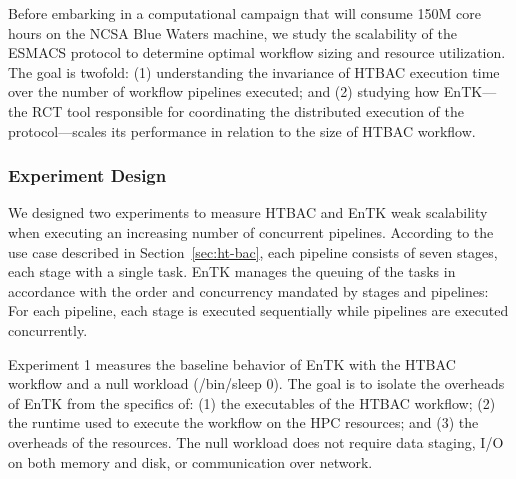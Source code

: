 
Before embarking in a computational campaign that will consume 150M core
hours on the NCSA Blue Waters machine, we study the scalability of the ESMACS
protocol to determine optimal workflow sizing and resource utilization. The
goal is twofold: (1) understanding the invariance of HTBAC execution time
over the number of workflow pipelines executed; and (2) studying how
EnTK---the RCT tool responsible for coordinating the distributed execution of
the protocol---scales its performance in relation to the size of HTBAC
workflow.

\subsubsection{Experiment Design}\label{ssec:exp_design}

We designed two experiments to measure HTBAC and EnTK weak scalability when
executing an increasing number of concurrent pipelines. According to the use
case described in Section~\ref{sec:ht-bac}, each pipeline consists of seven
stages, each stage with a single task. EnTK manages the queuing of the tasks
in accordance with the order and concurrency mandated by stages and
pipelines: For each pipeline, each stage is executed sequentially while
pipelines are executed concurrently.



Experiment 1 measures the baseline behavior of EnTK with the HTBAC workflow
and a null workload (\textmd{/bin/sleep 0}). The goal is to isolate the
overheads of EnTK from the specifics of: (1) the executables of the HTBAC
workflow; (2) the runtime used to execute the workflow on the HPC resources;
and (3) the overheads of the resources. The null workload does not require
data staging, I/O on both memory and disk, or communication over network.

